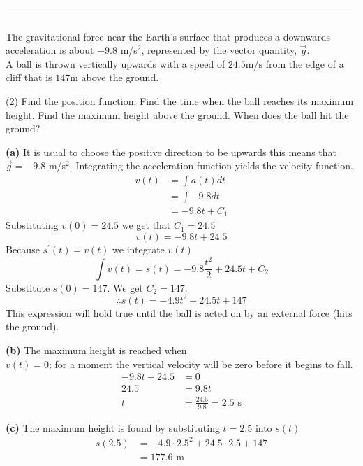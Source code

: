\rule{6.8cm}{0.5pt}\\

The gravitational force near the Earth's surface that produces a downwards acceleration is about $-9.8$ m/s$^2$, represented by the vector quantity, $\vec{g}$.\\
\example A ball is thrown vertically upwards with a speed of $24.5 \mbox{m}$/$\mbox{s}$ from the edge of a cliff that is $147 \mbox{m}$ above the ground. 
\begin{tasks}[column-sep=30pt](2)
\task Find the position function. 
\task Find the time when the ball reaches its maximum height. 
\task Find the maximum height above the ground. 
\task When does the ball hit the ground? \end{tasks}

\clearpage\solution
\begin{multicols}{2} \textbf{(a)} It is usual to choose the positive direction
to be upwards this means that $\vec{g}=-9.8$ m/s$^2$. Integrating the acceleration function yields the velocity function.
\begin{align*}v(t)&=\int a(t)dt\\
&  =\int -9.8dt\\
&=-9.8t +C_{1}\end{align*}
Substituting $v (0) =24.5$ we get that $C_{1} =24.5$
\begin{equation*}v (t) = -9.8 t +24.5
\end{equation*}
Because $s^{ \prime } (t) =v (t)$ we integrate $v (t)$
\begin{equation*}\int v(t)=s(t)=-9.8 \frac{t^{2}}{2} +24.5 t +C_{2}
\end{equation*}
Substitute $s (0) =147$. We get $C_{2} =147$.
\begin{equation*}\therefore s(t) = -4.9 t^{2} +24.5 t +147
\end{equation*}
This expression will hold true until the ball is acted on by an external force (hits the ground).

\textbf{(b)} The maximum height is reached when\\ $v (t) =0$; for a moment the vertical velocity will be zero before it begins to fall.
\begin{align*} -9.8 t +24.5 &  = 0 \\
24.5 &  = 9.8 t \\
t &  = \frac{24.5}{9.8}=2.5\text{ s}\end{align*}

\textbf{(c)} The maximum height is found by substituting $t =2.5$ into $s(t)$
\begin{align*}s (2.5) &  =  -4.9 \cdot 2.5^{2} +24.5 \cdot 2.5 +147 \\
 &=177.6 \text{ m}\end{align*}


\end{multicols}
